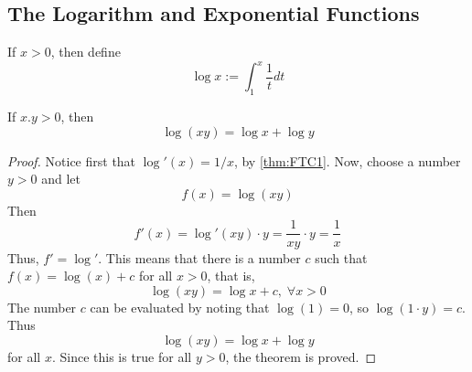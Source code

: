 \begin{subappendices}
    \section{The Logarithm and Exponential Functions}
    
    \begin{defn}
        If $x > 0$, then define \begin{equation}
            \log x := \int_1^x\frac{1}{t}dt
        \end{equation}
    \end{defn}

    \begin{thm}
        If $x.y > 0$, then \begin{equation}
            \log(xy) = \log x+ \log y
        \end{equation}
    \end{thm}
    \begin{proof}
        Notice first that $\log'(x) = 1/x$, by \ref{thm:FTC1}. Now, choose a number $y > 0$ and let \begin{equation*}
            f(x) = \log(xy)
        \end{equation*}
        Then\begin{equation*}
            f'(x) = \log'(xy)\cdot y = \frac{1}{xy}\cdot y = \frac{1}{x}
        \end{equation*}
        Thus, $f' = \log'$. This means that there is a number $c$ such that $f(x) = \log(x) + c$ for all $x > 0$, that is, \begin{equation*}
            \log(xy) = \log x+c,\;\forall x > 0
        \end{equation*}
        The number $c$ can be evaluated by noting that $\log(1) = 0$, so $\log(1\cdot y) = c$. Thus \begin{equation*}
            \log(xy) = \log x + \log y
        \end{equation*}
        for all $x$. Since this is true for all $y > 0$, the theorem is proved.
    \end{proof}


\end{subappendices}
